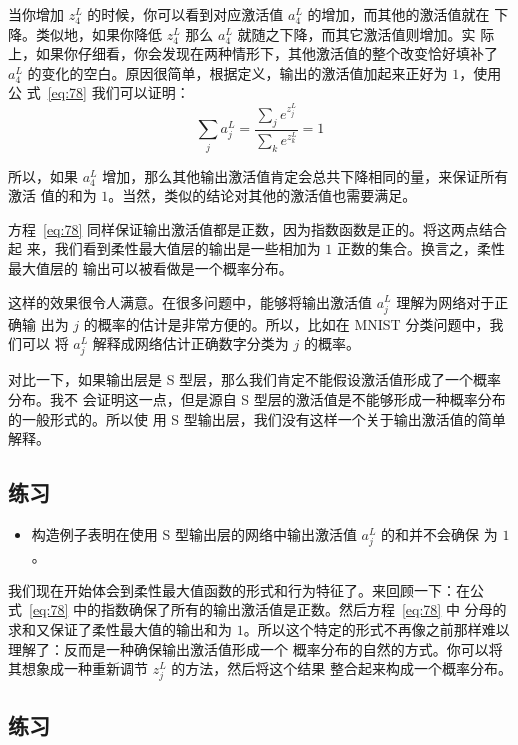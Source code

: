 当你增加 $z^L_4$ 的时候，你可以看到对应激活值 $a^L_4$ 的增加，而其他的激活值就在
下降。类似地，如果你降低 $z^L_4$ 那么 $a^L_4$ 就随之下降，而其它激活值则增加。实
际上，如果你仔细看，你会发现在两种情形下，其他激活值的整个改变恰好填补了 $a^L_4$
的变化的空白。原因很简单，根据定义，输出的激活值加起来正好为 $1$，使用公
式~\eqref{eq:78} 我们可以证明：
\begin{equation}
  \sum_j a^L_j = \frac{\sum_j e^{z^L_j}}{\sum_k e^{z^L_k}} = 1
  \label{eq:79}\tag{79}
\end{equation}

所以，如果 $a^L_4$ 增加，那么其他输出激活值肯定会总共下降相同的量，来保证所有激活
值的和为 $1$。当然，类似的结论对其他的激活值也需要满足。

方程~\eqref{eq:78} 同样保证输出激活值都是正数，因为指数函数是正的。将这两点结合起
来，我们看到柔性最大值层的输出是一些相加为 $1$ 正数的集合。换言之，柔性最大值层的
输出可以被看做是一个概率分布。

这样的效果很令人满意。在很多问题中，能够将输出激活值 $a^L_j$ 理解为网络对于正确输
出为 $j$ 的概率的估计是非常方便的。所以，比如在 MNIST 分类问题中，我们可以
将 $a^L_j$ 解释成网络估计正确数字分类为 $j$ 的概率。

对比一下，如果输出层是 S 型层，那么我们肯定不能假设激活值形成了一个概率分布。我不
会证明这一点，但是源自 S 型层的激活值是不能够形成一种概率分布的一般形式的。所以使
用 S 型输出层，我们没有这样一个关于输出激活值的简单解释。

\subsection*{练习}

\begin{itemize}
\item 构造例子表明在使用 S 型输出层的网络中输出激活值 $a^L_j$ 的和并不会确保
  为 $1$。
\end{itemize}

我们现在开始体会到柔性最大值函数的形式和行为特征了。来回顾一下：在公
式~\eqref{eq:78} 中的指数确保了所有的输出激活值是正数。然后方程~\eqref{eq:78} 中
分母的求和又保证了柔性最大值的输出和为
$1$。所以这个特定的形式不再像之前那样难以理解了：反而是一种确保输出激活值形成一个
概率分布的自然的方式。你可以将其想象成一种重新调节 $z^L_j$ 的方法，然后将这个结果
整合起来构成一个概率分布。

\subsection*{练习}

